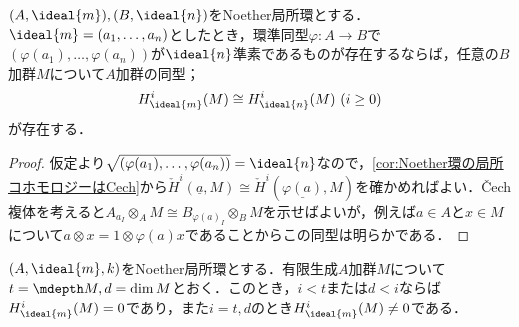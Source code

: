 \begin{lem}\label{lem:Noether局所環の局所コホモロジーが一致する条件}
	$(A,\ideal{m}),(B,\ideal{n})$をNoether局所環とする．$\ideal{m}=(a_1,\dots,a_n)$としたとき，環準同型$\varphi:A\to B$で$(\varphi(a_1),\dots,\varphi(a_n))$が$\ideal{n}$準素であるものが存在するならば，任意の$B$加群$M$について$A$加群の同型；
	\[H^i_{\ideal{m}}(M)\cong H^i_{\ideal{n}}(M)~(i\geq 0)\]
	が存在する．
\end{lem}

\begin{proof}
	仮定より$\sqrt{(\varphi(a_1),\dots,\varphi(a_n))}=\ideal{n}$なので，\ref{cor:Noether環の局所コホモロジーはCech}から$\check{H}^i(\underline{a},M)\cong\check{H}^i(\underline{\varphi(a)},M)$を確かめればよい．Čech複体を考えると$A_{a_I}\otimes_A M\cong B_{\varphi(a)_I}\otimes_B M$を示せばよいが，例えば$a\in A$と$x\in M$について$a\otimes x=1\otimes \varphi(a)x$であることからこの同型は明らかである．
\end{proof}

\begin{thm}
	$(A,\ideal{m},k)$をNoether局所環とする．有限生成$A$加群$M$について$t=\mdepth M, d=\dim M$とおく．このとき，$i<t$または$d<i$ならば$H^i_{\ideal{m}}(M)=0$であり，また$i=t,d$のとき$H^i_{\ideal{m}}(M)\neq 0$である．
\end{thm}

